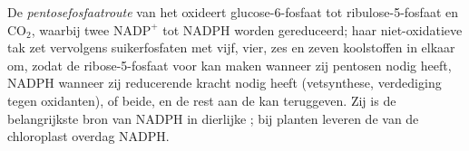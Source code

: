 \begin{definition}[De pentosefosfaatroute]\label{def:b1:biosyntheses-integration:ppp}
De \emph{pentosefosfaatroute} van het  oxideert glucose-6-fosfaat tot
ribulose-5-fosfaat en $\mathrm{CO_2}$, waarbij twee $\mathrm{NADP^+}$ tot NADPH
worden gereduceerd; haar niet-oxidatieve tak zet vervolgens suikerfosfaten met
vijf, vier, zes en zeven koolstoffen in elkaar om, zodat de 
ribose-5-fosfaat voor  kan maken wanneer zij pentosen nodig heeft,
NADPH wanneer zij reducerende kracht nodig heeft (vetsynthese, verdediging tegen
oxidanten), of beide, en de rest aan de  kan teruggeven. Zij is de
belangrijkste bron van NADPH in dierlijke ; bij planten leveren de
 van de chloroplast overdag NADPH.
\end{definition}

